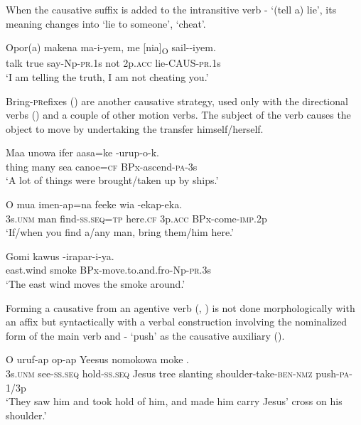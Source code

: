 When the causative suffix is added to the intransitive verb - `(tell a) lie', its meaning changes into `lie to someone', `cheat'. 

\ea%
\label{ex:3:x448}
\gll Opor(a) makena ma-i-yem, me [nia]\textsubscript{O} sail--iyem. \\
talk true say-Np-\textsc{pr}.1s not 2p.\textsc{acc} lie-CAUS-\textsc{pr}.1s\\
\glt`I am telling the truth, I am not cheating you.'
\z

Bring-\textsc{pr}efixes () are another causative strategy, used only with the directional verbs () and a couple of other motion verbs. The subject of the verb causes the object to move by undertaking the transfer himself/herself.

\ea%
\label{ex:3:x999}
\gll Maa unowa ifer aasa=ke -urup-o-k. \\
thing many sea canoe=\textsc{cf} BPx-ascend-\textsc{pa}-3s\\
\glt`A lot of things were brought/taken up by ships.'
\z

\ea%
\label{ex:3:x1001}
\gll O mua imen-ap=na feeke wia -ekap-eka. \\
3s.\textsc{unm} man find-\textsc{ss}.\textsc{seq}=\textsc{tp} here.\textsc{cf} 3p.\textsc{acc} BPx-come-\textsc{imp}.2p\\
\glt`If/when you find a/any man, bring them/him here.'
\z

\ea%
\label{ex:3:x1000}
\gll Gomi kawus -irapar-i-ya. \\
east.wind smoke BPx-move.to.and.fro-Np-\textsc{pr}.3s\\
\glt`The east wind moves the smoke around.'
\z

Forming a causative from an agentive verb (, \citealt[112]{Talmy2007}) is not done morphologically with an affix but syntactically with a verbal construction involving the nominalized form of the main verb and - `push' as the causative auxiliary (). 

\ea%
\label{ex:3:x1003}
\gll O uruf-ap op-ap Yeesus nomokowa moke  .\\
3s.\textsc{unm} see-\textsc{ss}.\textsc{seq} hold-\textsc{ss}.\textsc{seq} Jesus tree slanting shoulder-take-\textsc{ben}-\textsc{nmz} push-\textsc{pa}-1/3p\\
\glt`They saw him and took hold of him, and made him carry Jesus' cross on his shoulder.'
\z

